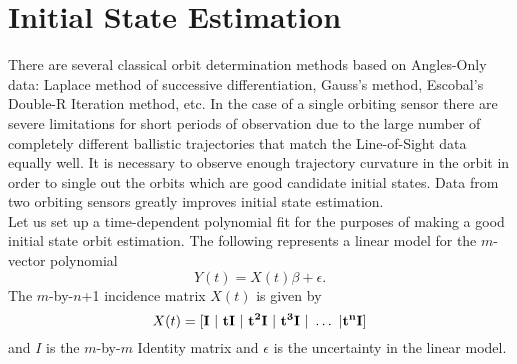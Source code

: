 \section{Initial State Estimation}

There are several classical orbit determination methods based on Angles-Only data: Laplace method of successive differentiation, Gauss's method, Escobal's Double-R Iteration method, etc. In the case of a single orbiting sensor there are severe limitations for short periods of observation due to the large number of completely different ballistic trajectories that match the Line-of-Sight data equally well. It is necessary to observe enough trajectory curvature in the orbit in order to single out the orbits which are good candidate initial states. Data from two orbiting sensors greatly improves initial state estimation.\\

Let us set up a time-dependent polynomial fit for the purposes of making a good initial state orbit estimation. The following represents a linear model for the $m$-vector polynomial 
$$Y(t) = X(t) \beta  + \epsilon.$$ The $m$-by-$n$+1 incidence matrix $X(t)$ is given by $$X(t) = [ \bf{I}~ |~ t \bf{I}~ |~ t^2 \bf{I}~|~ t^3 \bf{I}~|~ \hdots~ | t^n \bf{I} ] $$ and $I$ is the $m$-by-$m$ Identity matrix and $\epsilon$ is the uncertainty in the linear model. 




